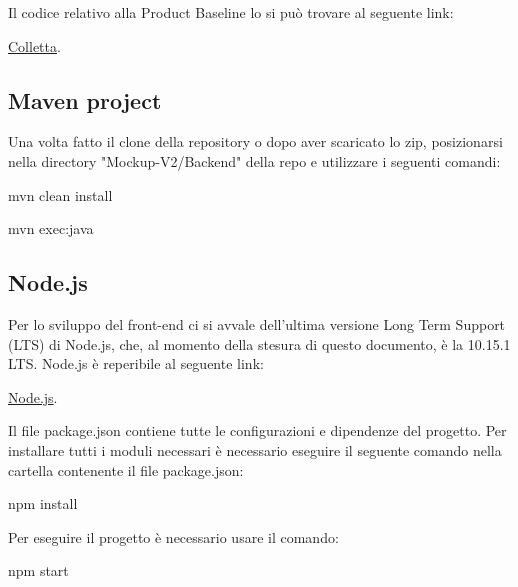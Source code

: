 Il codice relativo alla Product Baseline lo si può trovare al seguente link:
\begin{center}
\href{https://github.com/SWEightgroup/Development}{Colletta}. 
\end{center}

\subsection{Maven project}
Una volta fatto il clone della repository o dopo aver scaricato lo zip, posizionarsi nella directory "Mockup-V2/Backend" della repo e utilizzare i seguenti comandi:

\begin{center}
\textsf{mvn clean install}
\end{center}

\begin{center}
\textsf{mvn exec:java}
\end{center}

\subsection{Node.js}
Per lo sviluppo del front-end ci si avvale dell’ultima versione Long Term Support (LTS) di Node.js, che, al momento della stesura di questo documento, è la 10.15.1 LTS. Node.js è reperibile al
seguente link:

\begin{center}
\href{https://nodejs.org/it/}{Node.js}. 
\end{center}

Il file package.json contiene tutte le configurazioni e dipendenze del progetto. Per installare tutti i moduli
necessari è necessario eseguire il seguente comando nella cartella contenente il file package.json:
\begin{center}
\textsf{npm install}
\end{center}
Per eseguire il progetto è necessario usare il comando:
\begin{center}
\textsf{npm start}
\end{center}
